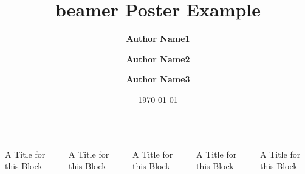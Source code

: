 \documentclass{beamer}
\title{\huge beamer Poster Example}
\author{\large \textbf{Author Name1} \and 
		\textbf{Author Name2} \and 
		\textbf{Author Name3}}
\institute{\Large Home Institute for Science and 				Technology}
\date{\today}
\begin{document}
	\begin{frame}
		\maketitle
		\begin{columns}[t]
			\begin{block}{A Title for this Block}
				\kant[1-2]
   	   		\end{block} 
	   	    \begin{block}{A Title for this Block}
				\kant[1]
	   	    \end{block} 
			\begin{alertblock}{A Title for this Block}
				\kant[1]
   	    	\end{alertblock} 
	   	    \begin{alertblock}{A Title for this Block}
				\kant[1-2]
	   	    \end{alertblock} 
			\begin{exampleblock}{A Title for this Block}
				\kant[1-3]
				\vphantom{------------}
   	    	\end{exampleblock}  
		\end{columns}
	\end{frame}
\end{document}
